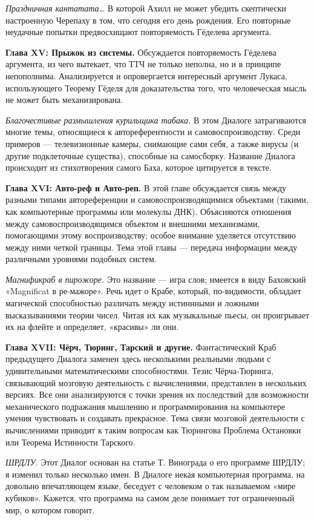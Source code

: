\emph{Праздничная кантатата\ldots{}} В которой Ахилл не может убедить скептически настроенную Черепаху в том, что сегодня его день рождения. Его повторные неудачные попытки предвосхищают повторяемость Гёделева аргумента.

\textbf{Глава XV: Прыжок из системы.} Обсуждается повторяемость Гёделева аргумента, из чего вытекает, что ТТЧ не только неполна, но и в принципе непополнима. Анализируется и опровергается интересный аргумент Лукаса, использующего Теорему Гёделя для доказательства того, что человеческая мысль не может быть механизирована.

\emph{Благочестивые размышления курильщика табака.} В этом Диалоге затрагиваются многие темы, относящиеся к автореферентности и самовоспроизводству. Среди примеров --- телевизионные камеры, снимающие сами себя, а также вирусы (и другие подклеточные существа), способные на самосборку. Название Диалога происходит из стихотворения самого Баха, которое цитируется в тексте.

\textbf{Глава XVI: Авто-реф и Авто-реп.} В этой главе обсуждается связь между разными типами автореференции и самовоспроизводящимися объектами (такими, как компьютерные программы или молекулы ДНК). Объясняются отношения между самовоспроизводящимся объектом и внешними механизмами, помогающими этому воспроизводству; особое внимание уделяется отсутствию между ними четкой границы. Тема этой главы --- передача информации между различными уровнями подобных систем.

\emph{Магнификраб в пирожоре.} Это название --- игра слов; имеется в виду Баховский «Magnificat в ре-мажоре». Речь идет о Крабе, который, по-видимости, обладает магической способностью различать между истиннными и ложными высказываниями теории чисел. Читая их как музыкальные пьесы, он проигрывает их на флейте и определяет, «красивы» ли они.

\textbf{Глава XVII: Чёрч, Тюринг, Тарский и другие.} Фантастический Краб предыдущего Диалога заменен здесь несколькими реальными людьми с удивительными математическими способностями. Тезис Чёрча-Тюринга, связывающий мозговую деятельность с вычислениями, представлен в нескольких версиях. Все они анализируются с точки зрения их последствий для возможности механического подражания мышлению и программирования на компьютере умения чувствовать и создавать прекрасное. Тема связи мозговой деятельности с вычислениями приводит к таким вопросам как Тюрингова Проблема Остановки или Теорема Истинности Тарского.

\emph{ШРДЛУ.} Этот Диалог основан на статье Т. Винограда о его программе ШРДЛУ; я изменил только несколько имен. В Диалоге некая компьютерная программа, на довольно впечатляющем языке, беседует с человеком о так называемом «мире кубиков». Кажется, что программа на самом деле понимает тот ограниченный мир, о котором говорит.

